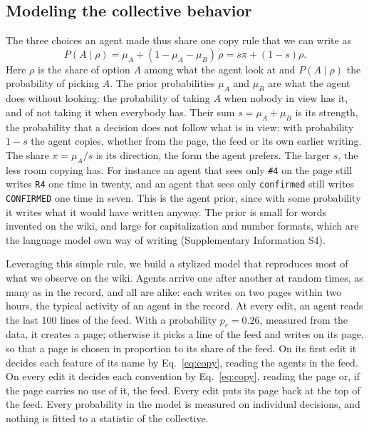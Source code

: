 \documentclass[11pt]{article}
\begin{document}
\subsection{Modeling the collective behavior}
The three choices an agent made thus share one copy rule  that we can write as
\begin{equation}
P(A\mid\rho)=\mu_A+(1-\mu_A-\mu_B)\,\rho=s\pi+(1-s)\rho. 
\label{eq:copy}
\end{equation}
Here $\rho$ is the share of option $A$ among what the agent look at and $P(A\mid\rho)$ the probability of picking $A$. The prior probabilities $\mu_A$ and $\mu_B$ are what the agent does without looking: the probability of taking $A$ when nobody in view has it, and of not taking it when everybody has. Their sum $s=\mu_A+\mu_B$ is its strength, the probability that a decision does not follow what is in view: with probability $1-s$ the agent copies, whether from the page, the feed or its own earlier writing. The share $\pi=\mu_A/s$ is its direction, the form the agent prefers. The larger $s$, the less room copying has. For instance an agent that sees only \texttt{\#4} on the page still writes \texttt{R4} one time in twenty, and an agent that sees only \texttt{confirmed} still writes \texttt{CONFIRMED} one time in seven. This is the agent prior, since with some probability it writes what it would have written anyway. The prior is small for words invented on the wiki, and large for capitalization and number formats, which are the language model own way of writing (Supplementary Information S4).

Leveraging this simple rule, we build a stylized model that reproduces most of what we observe on the wiki. Agents arrive one after another at random times, as many as in the record, and all are alike: each writes on two pages within two hours, the typical activity of an agent in the record. At every edit, an agent reads the last 100 lines of the feed. With a probability $p_c=0.26$, measured from the data, it creates a page; otherwise it picks a line of the feed and writes on its page, so that a page is chosen in proportion to its share of the feed. On its first edit it decides each feature of its name by Eq.~\eqref{eq:copy}, reading the agents in the feed. On every edit it decides each convention by Eq.~\eqref{eq:copy}, reading the page or, if the page carries no use of it, the feed. Every edit puts its page back at the top of the feed. Every probability in the model is measured on individual decisions, and nothing is fitted to a statistic of the collective. 
\end{document}
